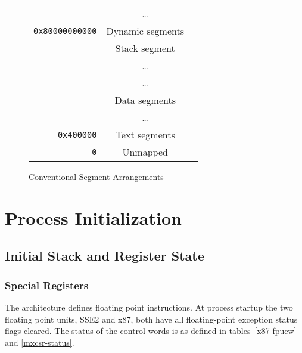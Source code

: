 \begin{figure}[H]
\Hrule
  \caption{Conventional Segment Arrangements}
  \label{fig-cfg}
  \begin{center}
    \begin{tabular}{r|c|l}
      \cline{2-2}
      & \dots & \\
      \verb|0x80000000000| & Dynamic segments & \\ \cline{2-2}
      & Stack segment & \\
      & \dots & \\ \cline{2-2}
      & \dots & \\
      & Data segments & \\ \cline{2-2}
      & \dots & \\
      \verb|0x400000| & Text segments & \\ \cline{2-2}
      \verb|0| & Unmapped & \\ \cline{2-2}
    \end{tabular}
  \end{center}
\Hrule
\end{figure}

\section{Process Initialization}

\subsection{Initial Stack and Register State}

\subsubsection{Special Registers}

The \xARCH architecture defines floating point instructions.  At
process startup the two floating point units, SSE2 and x87, both have
all floating-point exception status flags cleared.  The status of the
control words is as defined in tables~\ref{x87-fpucw} and
\ref{mxcsr-status}.

